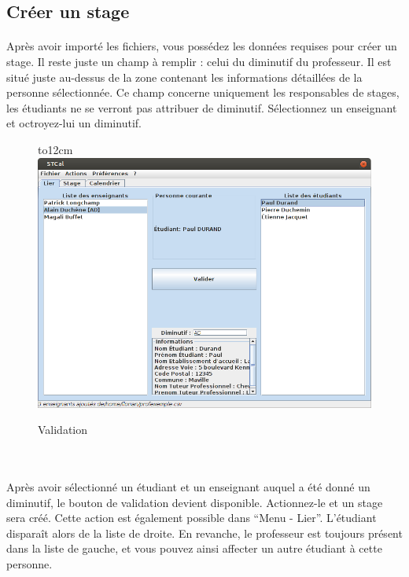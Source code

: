 \documentclass[a4paper,10pt]{report}
\begin{document}
      \subsection{Créer un stage}
	\paragraph{}
	  Après avoir importé les fichiers, vous possédez les données requises pour créer un stage.
	  Il reste juste un champ à remplir : celui du diminutif du professeur. 
	  Il est situé juste au-dessus de la zone contenant les informations détaillées de la personne sélectionnée.
	  Ce champ concerne uniquement les responsables de stages, les étudiants ne se verront pas attribuer de diminutif.
	  Sélectionnez un enseignant et octroyez-lui un diminutif.
	  
	
	\begin{figure}[H]
	  \hbox to12cm{\hss\includegraphics[width=14cm]{../general/validation.png}\hss}
	  \caption{Validation}
	\end{figure}
	~\\
	\paragraph{}
	  Après avoir sélectionné un étudiant et un enseignant auquel a été donné un diminutif, le bouton de validation devient disponible.
	  Actionnez-le et un stage sera créé.
	  Cette action est également possible dans ``Menu - Lier''.
	  L'étudiant disparaît alors de la liste de droite.
	  En revanche, le professeur est toujours présent dans la liste de gauche, et vous pouvez ainsi affecter un autre étudiant à cette personne.
	  
\end{document}
